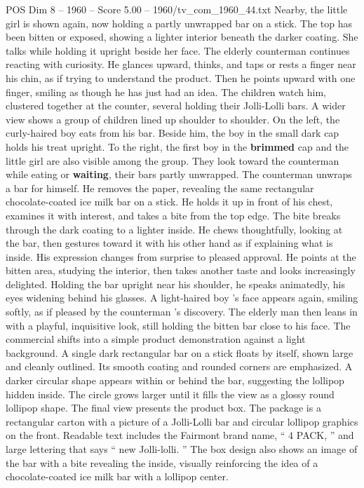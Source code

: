\begin{textsample}{POS Dim 8 – 1960 – Score 5.00 – 1960/tv\_com\_1960\_44.txt}
Nearby, the little girl is shown again, now holding a partly unwrapped bar on a stick.
The top has been bitten or exposed, showing a lighter interior beneath the darker coating.
She talks while holding it upright beside her face.
The elderly counterman continues reacting with curiosity.
He glances upward, thinks, and taps or rests a finger near his chin, as if trying to understand the product.
Then he points upward with one finger, smiling as though he has just had an idea.
The children watch him, clustered together at the counter, several holding their Jolli-Lolli bars.
A wider view shows a group of children lined up shoulder to shoulder.
On the left, the curly-haired boy eats from his bar.
Beside him, the boy in the small dark cap holds his treat upright.
To the right, the first boy in the \textbf{brimmed} cap and the little girl are also visible among the group.
They look toward the counterman while eating or \textbf{waiting}, their bars partly unwrapped.
The counterman unwraps a bar for himself.
He removes the paper, revealing the same rectangular chocolate-coated ice milk bar on a stick.
He holds it up in front of his chest, examines it with interest, and takes a bite from the top edge.
The bite breaks through the dark coating to a lighter inside.
He chews thoughtfully, looking at the bar, then gestures toward it with his other hand as if explaining what is inside.
His expression changes from surprise to pleased approval.
He points at the bitten area, studying the interior, then takes another taste and looks increasingly delighted.
Holding the bar upright near his shoulder, he speaks animatedly, his eyes widening behind his glasses.
A light-haired boy ’s face appears again, smiling softly, as if pleased by the counterman ’s discovery.
The elderly man then leans in with a playful, inquisitive look, still holding the bitten bar close to his face.
The commercial shifts into a simple product demonstration against a light background.
A single dark rectangular bar on a stick floats by itself, shown large and cleanly outlined.
Its smooth coating and rounded corners are emphasized.
A darker circular shape appears within or behind the bar, suggesting the lollipop hidden inside.
The circle grows larger until it fills the view as a glossy round lollipop shape.
The final view presents the product box.
The package is a rectangular carton with a picture of a Jolli-Lolli bar and circular lollipop graphics on the front.
Readable text includes the Fairmont brand name, “ 4 PACK, ” and large lettering that says “ new Jolli-lolli. ” The box design also shows an image of the bar with a bite revealing the inside, visually reinforcing the idea of a chocolate-coated ice milk bar with a lollipop center.

\end{textsample}
